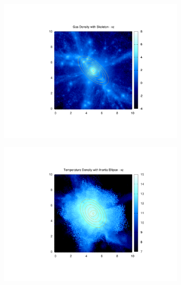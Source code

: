 \documentclass[journal]{IEEEtran}
\begin{document}
\begin{figure}[!t]
\begin{subfigure}[t]{0.3\textwidth}
		\includegraphics[width=\linewidth]{GasDenEllipxz.pdf}
	\end{subfigure}
	\quad
	\begin{subfigure}[t]{0.3\textwidth}
		\centering
		\includegraphics[width=\linewidth]{TempDenEllipxz.pdf}
	\end{subfigure}
	\\
	\begin{subfigure}[t]{0.3\textwidth}
		\centering

\end{subfigure}
\end{figure}
\end{document}
